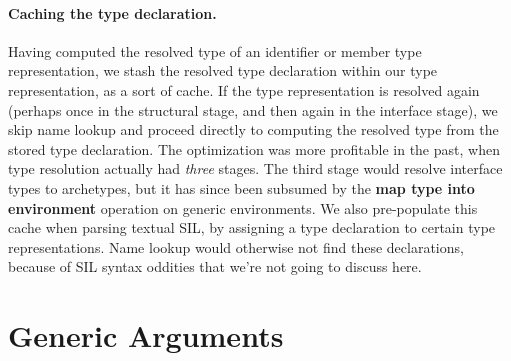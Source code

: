 \documentclass[../generics]{subfiles}
\begin{document}
\paragraph{Caching the type declaration.} Having computed the resolved type of an identifier or member type representation, we stash the resolved type declaration within our type representation, as a sort of cache. If the type representation is resolved again (perhaps once in the structural stage, and then again in the interface stage), we skip name lookup and proceed directly to computing the resolved type from the stored type declaration. The optimization was more profitable in the past, when type resolution actually had \emph{three} stages. The third stage would resolve interface types to archetypes, but it has since been subsumed by the \textbf{map type into environment} operation on generic environments. We also pre-populate this cache when parsing textual SIL, by assigning a type declaration to certain type representations. Name lookup would otherwise not find these declarations, because of SIL syntax oddities that we're not going to discuss here.

\section{Generic Arguments}\label{checking generic arguments}
\end{document}
